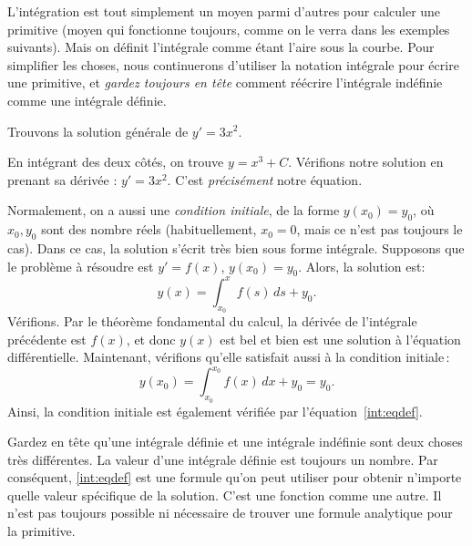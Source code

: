 L'intégration est tout simplement un moyen parmi d'autres pour calculer une primitive (moyen qui fonctionne toujours, comme on le  verra dans les exemples suivants).  Mais on définit l'intégrale comme étant l'aire sous la courbe.  Pour simplifier les choses, nous continuerons d'utiliser la notation intégrale pour écrire une primitive, et \emph{gardez toujours en tête} comment réécrire l'intégrale indéfinie comme une intégrale définie.

\begin{example}
Trouvons la solution générale de $y' = 3 x^2$.

En intégrant des deux côtés, on trouve $y = x^3 + C$.  Vérifions notre solution en prenant sa dérivée : 
$y' = 3x^2$.  C'est \emph{précisément} notre équation.
\end{example}

Normalement, on a aussi une {\em condition initiale}, de la forme $y(x_0) = y_0$, où $x_0,y_0$ sont des nombre réels  (habituellement, $x_0=0$, mais ce n'est pas toujours le cas).  Dans ce cas, la solution s'écrit très bien sous forme intégrale.  Supposons que le problème à résoudre est $y' = f(x)$, $y(x_0) = y_0$. Alors, la solution est:
\begin{equation} \label{int:eqdef}
	y(x) = \int_{x_0}^x f(s) \,ds + y_0 .
\end{equation}
Vérifions.  Par le théorème fondamental du calcul, la dérivée de l'intégrale précédente est $f(x)$, et donc $y(x)$ est bel et bien est une solution à l'équation différentielle.  Maintenant, vérifions qu'elle satisfait aussi à la condition initiale\,:
\begin{equation*}
	y(x_0) = \int_{x_0}^{x_0} f(x)\,dx + y_0 = y_0.
\end{equation*}
Ainsi, la condition initiale est également vérifiée par l'équation~\eqref{int:eqdef}.

Gardez en tête qu'une intégrale définie et une intégrale indéfinie sont deux choses très différentes.  La valeur d'une intégrale définie est toujours un nombre.  Par conséquent, \eqref{int:eqdef} est une formule qu'on peut utiliser pour obtenir n'importe quelle valeur spécifique de la solution.  C'est une fonction comme une autre.  Il n'est pas toujours possible ni nécessaire de trouver une formule analytique pour la primitive. 


